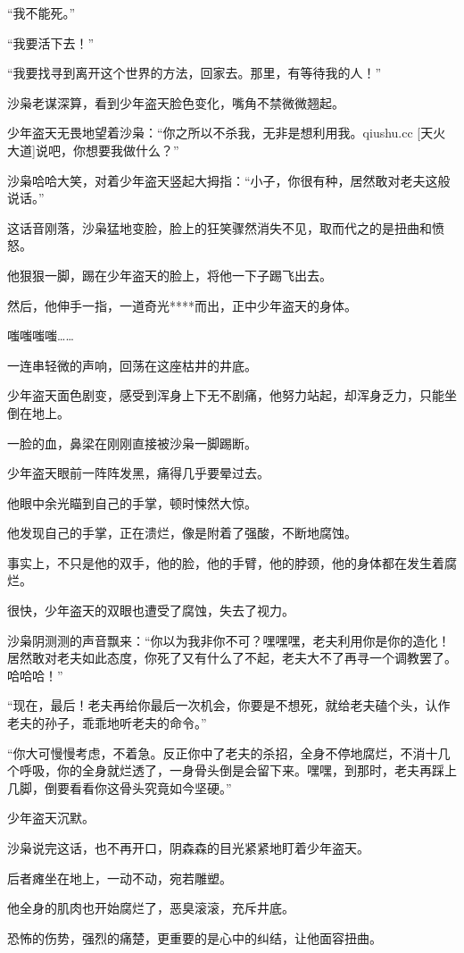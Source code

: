 \begin{this_body}
“我不能死。”

“我要活下去！”

“我要找寻到离开这个世界的方法，回家去。那里，有等待我的人！”

沙枭老谋深算，看到少年盗天脸色变化，嘴角不禁微微翘起。

少年盗天无畏地望着沙枭：“你之所以不杀我，无非是想利用我。qiushu.cc [天火大道]说吧，你想要我做什么？”

沙枭哈哈大笑，对着少年盗天竖起大拇指：“小子，你很有种，居然敢对老夫这般说话。”

这话音刚落，沙枭猛地变脸，脸上的狂笑骤然消失不见，取而代之的是扭曲和愤怒。

他狠狠一脚，踢在少年盗天的脸上，将他一下子踢飞出去。

然后，他伸手一指，一道奇光****而出，正中少年盗天的身体。

嗤嗤嗤嗤……

一连串轻微的声响，回荡在这座枯井的井底。

少年盗天面色剧变，感受到浑身上下无不剧痛，他努力站起，却浑身乏力，只能坐倒在地上。

一脸的血，鼻梁在刚刚直接被沙枭一脚踢断。

少年盗天眼前一阵阵发黑，痛得几乎要晕过去。

他眼中余光瞄到自己的手掌，顿时悚然大惊。

他发现自己的手掌，正在溃烂，像是附着了强酸，不断地腐蚀。

事实上，不只是他的双手，他的脸，他的手臂，他的脖颈，他的身体都在发生着腐烂。

很快，少年盗天的双眼也遭受了腐蚀，失去了视力。

沙枭阴测测的声音飘来：“你以为我非你不可？嘿嘿嘿，老夫利用你是你的造化！居然敢对老夫如此态度，你死了又有什么了不起，老夫大不了再寻一个调教罢了。哈哈哈！”

“现在，最后！老夫再给你最后一次机会，你要是不想死，就给老夫磕个头，认作老夫的孙子，乖乖地听老夫的命令。”

“你大可慢慢考虑，不着急。反正你中了老夫的杀招，全身不停地腐烂，不消十几个呼吸，你的全身就烂透了，一身骨头倒是会留下来。嘿嘿，到那时，老夫再踩上几脚，倒要看看你这骨头究竟如今坚硬。”

少年盗天沉默。

沙枭说完这话，也不再开口，阴森森的目光紧紧地盯着少年盗天。

后者瘫坐在地上，一动不动，宛若雕塑。

他全身的肌肉也开始腐烂了，恶臭滚滚，充斥井底。

恐怖的伤势，强烈的痛楚，更重要的是心中的纠结，让他面容扭曲。


\end{this_body}
